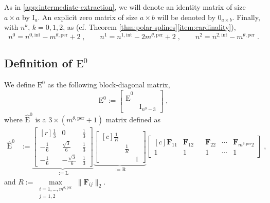 \documentclass[10pt]{article}
\newcommand{\mbf}[1]{{\boldsymbol{#1}}}
\newcommand{\mat}[1]{\mbf{\mathrm{#1}}}
\newcommand{\cU}{\theta}
\newcommand{\per}{\mathrm{per}}
\newcommand{\pndofU}{m^{\cU,\per}}
\newcommand{\tint}{\mathrm{int}}
\theoremstyle{plain}
\theoremstyle{definition}
\theoremstyle{remark}
\begin{document}
As in \cref{app:intermediate-extraction}, we will denote an identity matrix of size $a \times a$ by $\mat{I}_a$.
An explicit zero matrix of size $a \times b$ will be denoted by $\mat{0}_{a \times b}$.
Finally, with $n^k$, $k = 0, 1, 2$, as (cf. Theorem \ref{thm:polar-splines}\ref{item:cardinality}),
\begin{equation}
    n^0 = n^{0,\tint} - \pndofU + 2\;,\qquad
    n^1 = n^{1,\tint} - 2\pndofU + 2\;,\qquad
    n^2 = n^{2,\tint} - \pndofU\;.
\end{equation}

\subsection{Definition of $\mat{E}^0$}
We define $\mat{E}^0$ as the following block-diagonal matrix,
\begin{equation}\label{eq:polar-ext-0}
    \mat{E}^0 := 
    \begin{bmatrix}
    \widehat{\mat{E}}^0 &\\
    & \mat{I}_{n^0-3}
    \end{bmatrix}\;,
\end{equation}
where $\widehat{\mat{E}}^0$ is a $3 \times (\pndofU+1)$ matrix defined as
\begin{equation}\label{eq:polar-ext-0-core}
    \begin{split}
    \widehat{\mat{E}}^0 &:= 
    \underbrace{\begin{bmatrix*}[r]
        \frac{1}{3} & 0 & \frac{1}{3}\\
        -\frac{1}{6} & \frac{\sqrt{3}}{6} & \frac{1}{3}\\
        -\frac{1}{6} & -\frac{\sqrt{3}}{6} & \frac{1}{3}
    \end{bmatrix*}}_{:= \mat{L}}
    \underbrace{
    \begin{bmatrix*}[c]
        \frac{1}{R} & &\\
        & \frac{1}{R} & \\
        & & 1
    \end{bmatrix*}}_{:= \mat{R}}
    \begin{bmatrix*}[c]
        \mbf{F}_{11} & \mbf{F}_{12} & & \mbf{F}_{22} & \cdots & \mbf{F}_{\pndofU 2}\\
        1 & 1 & & 1 & \cdots & 1
    \end{bmatrix*}\;,
\end{split}
\end{equation}
and $R := \max\limits_{\substack{i = 1, \dots, \pndofU \\ j = 1, 2}} \|\mbf{F}_{ij}\|_2$.
\end{document}
